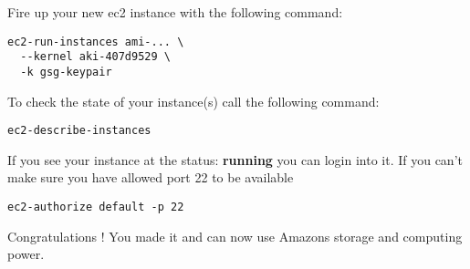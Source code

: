Fire up your new ec2 instance with the following command:

\begin{Command}{13cm}
\begin{verbatim}
ec2-run-instances ami-... \
  --kernel aki-407d9529 \
  -k gsg-keypair
\end{verbatim}
\end{Command}

To check the state of your instance(s) call the following command:

\begin{Command}{10cm}
\begin{verbatim}
ec2-describe-instances
\end{verbatim}
\end{Command}

If you see your instance at the status: \textbf{running} you can login
into it. If you can't make sure you have allowed port 22 to be available

\begin{Command}{10cm}
\begin{verbatim}
ec2-authorize default -p 22
\end{verbatim}
\end{Command}

Congratulations ! You made it and can now use Amazons storage and
computing power.
